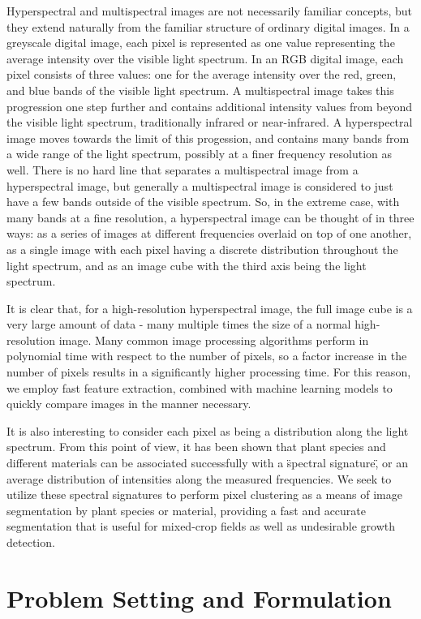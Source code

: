 Hyperspectral and multispectral images are not necessarily familiar concepts, but they extend naturally from the familiar structure of ordinary digital images.
In a greyscale digital image, each pixel is represented as one value representing the average intensity over the visible light spectrum.
In an RGB digital image, each pixel consists of three values: one for the average intensity over the red, green, and blue bands of the visible light spectrum.
A multispectral image takes this progression one step further and contains additional intensity values from beyond the visible light spectrum, traditionally infrared or near-infrared.
A hyperspectral image moves towards the limit of this progession, and contains many bands from a wide range of the light spectrum, possibly at a finer frequency resolution as well.
There is no hard line that separates a multispectral image from a hyperspectral image, but generally a multispectral image is considered to just have a few bands outside of the visible spectrum.
So, in the extreme case, with many bands at a fine resolution, a hyperspectral image can be thought of in three ways: as a series of images at different frequencies overlaid on top of one another, as a single image with each pixel having a discrete distribution throughout the light spectrum, and as an image cube with the third axis being the light spectrum.

It is clear that, for a high-resolution hyperspectral image, the full image cube is a very large amount of data - many multiple times the size of a normal high-resolution image.
Many common image processing algorithms perform in polynomial time with respect to the number of pixels, so a factor increase in the number of pixels results in a significantly higher processing time.
For this reason, we employ fast feature extraction, combined with machine learning models to quickly compare images in the manner necessary.

It is also interesting to consider each pixel as being a distribution along the light spectrum.
From this point of view, it has been shown that plant species and different materials can be associated successfully with a \"spectral signature\", or an average distribution of intensities along the measured frequencies.
We seek to utilize these spectral signatures to perform pixel clustering as a means of image segmentation by plant species or material, providing a fast and accurate segmentation that is useful for mixed-crop fields as well as undesirable growth detection.


\section{Problem Setting and Formulation}

